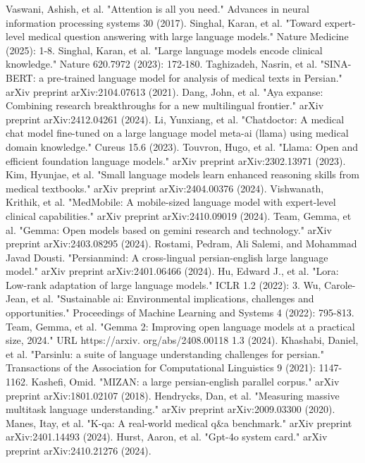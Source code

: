 \documentclass[conference]{IEEEtran}
\begin{document}
\begin{thebibliography}{00}
 Vaswani, Ashish, et al. "Attention is all you need." Advances in neural information processing systems 30 (2017).
 Singhal, Karan, et al. "Toward expert-level medical question answering with large language models." Nature Medicine (2025): 1-8.
Singhal, Karan, et al. "Large language models encode clinical knowledge." Nature 620.7972 (2023): 172-180.
 Taghizadeh, Nasrin, et al. "SINA-BERT: a pre-trained language model for analysis of medical texts in Persian." arXiv preprint arXiv:2104.07613 (2021).
 Dang, John, et al. "Aya expanse: Combining research breakthroughs for a new multilingual frontier." arXiv preprint arXiv:2412.04261 (2024).
 Li, Yunxiang, et al. "Chatdoctor: A medical chat model fine-tuned on a large language model meta-ai (llama) using medical domain knowledge." Cureus 15.6 (2023).
 Touvron, Hugo, et al. "Llama: Open and efficient foundation language models." arXiv preprint arXiv:2302.13971 (2023).
 Kim, Hyunjae, et al. "Small language models learn enhanced reasoning skills from medical textbooks." arXiv preprint arXiv:2404.00376 (2024).
 Vishwanath, Krithik, et al. "MedMobile: A mobile-sized language model with expert-level clinical capabilities." arXiv preprint arXiv:2410.09019 (2024).
 Team, Gemma, et al. "Gemma: Open models based on gemini research and technology." arXiv preprint arXiv:2403.08295 (2024).
 Rostami, Pedram, Ali Salemi, and Mohammad Javad Dousti. "Persianmind: A cross-lingual persian-english large language model." arXiv preprint arXiv:2401.06466 (2024).
 Hu, Edward J., et al. "Lora: Low-rank adaptation of large language models." ICLR 1.2 (2022): 3.
 Wu, Carole-Jean, et al. "Sustainable ai: Environmental implications, challenges and opportunities." Proceedings of Machine Learning and Systems 4 (2022): 795-813.
 Team, Gemma, et al. "Gemma 2: Improving open language models at a practical size, 2024." URL https://arxiv. org/abs/2408.00118 1.3 (2024).
 Khashabi, Daniel, et al. "Parsinlu: a suite of language understanding challenges for persian." Transactions of the Association for Computational Linguistics 9 (2021): 1147-1162.
 Kashefi, Omid. "MIZAN: a large persian-english parallel corpus." arXiv preprint arXiv:1801.02107 (2018).
 Hendrycks, Dan, et al. "Measuring massive multitask language understanding." arXiv preprint arXiv:2009.03300 (2020).
 Manes, Itay, et al. "K-qa: A real-world medical q\&a benchmark." arXiv preprint arXiv:2401.14493 (2024).
 Hurst, Aaron, et al. "Gpt-4o system card." arXiv preprint arXiv:2410.21276 (2024).
\end{thebibliography}
\end{document}
